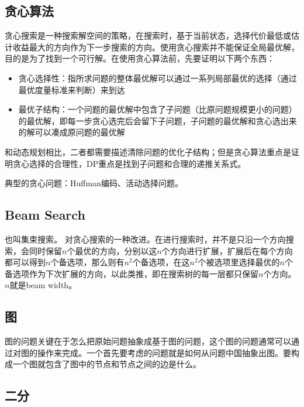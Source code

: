 \subsection{贪心算法}
贪心搜索是一种搜索解空间的策略，在搜索时，基于当前状态，选择代价最低或估计收益最大的方向作为下一步搜索的方向。使用贪心搜索并不能保证全局最优解，目的是为了找到一个可行解。在使用贪心算法前，先要证明以下两个东西：
\begin{itemize}
	\item 贪心选择性：指所求问题的整体最优解可以通过一系列局部最优的选择（通过最优度量标准来判断）来到达
	\item 最优子结构：一个问题的最优解中包含了子问题（比原问题规模更小的问题）的最优解，即每一步贪心选完后会留下子问题，子问题的最优解和贪心选出来的解可以凑成原问题的最优解
\end{itemize}
和动态规划相比，二者都需要描述清除问题的优化子结构；但是贪心算法重点是证明贪心选择的合理性，DP重点是找到子问题和合理的递推关系式。

典型的贪心问题：Huffman编码、活动选择问题。



\subsection{Beam Search}
也叫集束搜索。
对贪心搜索的一种改进。在进行搜索时，并不是只沿一个方向搜索，会同时保留$n$个最优的方向，分别以这$n$个方向进行扩展，扩展后在每个方向都可以得到$n$个备选项，那么则有$n^2$个备选项，在这$n^2$个被选项里选择最优的$n$个备选项作为下次扩展的方向，以此类推，即在搜索树的每一层都只保留$n$个方向。$n$就是beam width。

\subsection{图}
图的问题关键在于怎么把原始问题抽象成基于图的问题，这个图的问题通常可以通过对图的操作来完成。一个首先要考虑的问题就是如何从问题中国抽象出图。要构成一个图就包含了图中的节点和节点之间的边是什么。

\subsection{二分}
